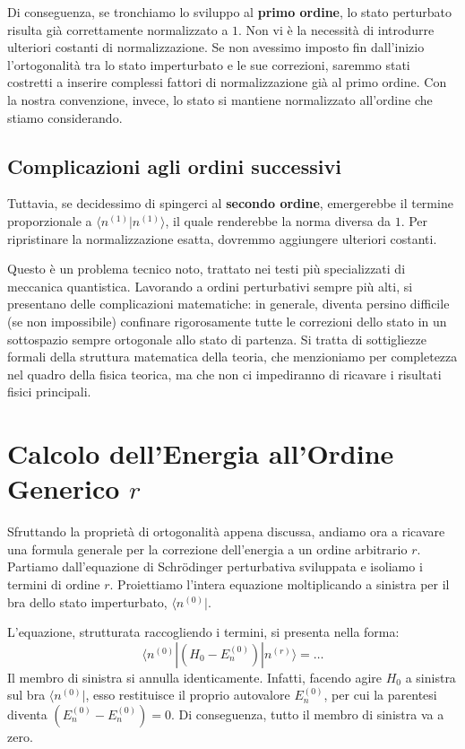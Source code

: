 Di conseguenza, se tronchiamo lo sviluppo al \textbf{primo ordine}, lo stato perturbato risulta già correttamente normalizzato a $1$. Non vi è la necessità di introdurre ulteriori costanti di normalizzazione.
Se non avessimo imposto fin dall'inizio l'ortogonalità tra lo stato imperturbato e le sue correzioni, saremmo stati costretti a inserire complessi fattori di normalizzazione già al primo ordine. Con la nostra convenzione, invece, lo stato si mantiene normalizzato all'ordine che stiamo considerando.

\subsection{Complicazioni agli ordini successivi}
Tuttavia, se decidessimo di spingerci al \textbf{secondo ordine}, emergerebbe il termine proporzionale a $\langle n^{(1)} \vert{} n^{(1)} \rangle$, il quale renderebbe la norma diversa da $1$. Per ripristinare la normalizzazione esatta, dovremmo aggiungere ulteriori costanti.

Questo è un problema tecnico noto, trattato nei testi più specializzati di meccanica quantistica. Lavorando a ordini perturbativi sempre più alti, si presentano delle complicazioni matematiche: in generale, diventa persino difficile (se non impossibile) confinare rigorosamente tutte le correzioni dello stato in un sottospazio sempre ortogonale allo stato di partenza. Si tratta di sottigliezze formali della struttura matematica della teoria, che menzioniamo per completezza nel quadro della fisica teorica, ma che non ci impediranno di ricavare i risultati fisici principali.

\section{Calcolo dell'Energia all'Ordine Generico $r$}

Sfruttando la proprietà di ortogonalità appena discussa, andiamo ora a ricavare una formula generale per la correzione dell'energia a un ordine arbitrario $r$.
Partiamo dall'equazione di Schrödinger perturbativa sviluppata e isoliamo i termini di ordine $r$. Proiettiamo l'intera equazione moltiplicando a sinistra per il bra dello stato imperturbato, $\langle n^{(0)} \vert{}$.

L'equazione, strutturata raccogliendo i termini, si presenta nella forma:
\begin{equation}
\langle n^{(0)} | \left( H_0 - E_n^{(0)} \right) | n^{(r)} \rangle = \dots
\end{equation}
Il membro di sinistra si annulla identicamente. Infatti, facendo agire $H_0$ a sinistra sul bra $\langle n^{(0)} \vert{}$, esso restituisce il proprio autovalore $E_n^{(0)}$, per cui la parentesi diventa $(E_n^{(0)} - E_n^{(0)}) = 0$. Di conseguenza, tutto il membro di sinistra va a zero.

